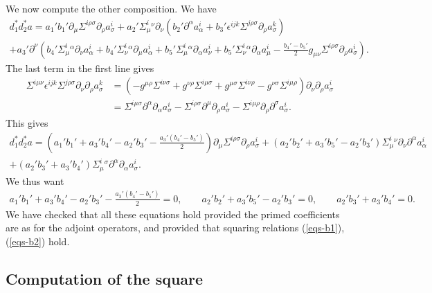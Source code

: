 \documentclass[10pt]{report}
\theoremstyle{definition}
\begin{document}
 We now compute the other composition. We have
 \begin{align}
 d_1^* d_2^* a = a_1' b_1' \partial_\mu \Sigma^{i\rho\sigma} \partial_\rho a_\sigma^i + a_2' \Sigma^i_\mu{}^\nu \partial_\nu (b_2' \partial^\alpha a_\alpha^i + b_3' \epsilon^{ijk} \Sigma^{j\rho\sigma} \partial_\rho a_\sigma^k) \\ \nonumber
 + a_3' \partial^\nu ( b_4' \Sigma^i_{\mu}{}^\alpha \partial_{\nu}a_\alpha^i + b_4' \Sigma^i_{\nu}{}^\alpha \partial_{\mu}a_\alpha^i +  b_5' \Sigma^i_{\mu}{}^\alpha \partial_\alpha a_{\nu}^i+  b_5' \Sigma^i_{\nu}{}^\alpha \partial_\alpha a_{\mu}^i - \frac{b_4'-b_5'}{2} g_{\mu\nu} \Sigma^{i\rho\sigma}\partial_\rho a^i_\sigma).
 \end{align}
 The last term in the first line gives
 \begin{align}
 \Sigma^{i\mu\nu} \epsilon^{ijk} \Sigma^{j\rho\sigma} \partial_\nu \partial_\rho a_\sigma^k & = ( - g^{\mu\rho} \Sigma^{i\nu\sigma} + g^{\nu\rho} \Sigma^{i\mu\sigma} + g^{\mu\sigma} \Sigma^{i\nu\rho} - g^{\nu\sigma} \Sigma^{i\mu\rho})  \partial_\nu \partial_\rho a_\sigma^i \\ \nonumber & = 
 \Sigma^{i\mu\sigma} \partial^\alpha \partial_\alpha   a_\sigma^i
 -  \Sigma^{i\rho\sigma}  \partial^\mu \partial_\rho a_\sigma^i -   \Sigma^{i\mu\rho}  \partial_\rho  \partial^\sigma a_\sigma^i.
 \end{align}
 This gives
 \begin{align}\nonumber
 d_1^* d_2^* a = (a_1' b_1' + a_3' b_4' -  a_2' b_3'  - \frac{a_3'(b_4'-b_5')}{2}) \partial_\mu \Sigma^{i\rho\sigma} \partial_\rho a_\sigma^i + (a_2' b_2'  +  a_3' b_5' -   a_2' b_3' ) \Sigma^i_\mu{}^\nu \partial_\nu  \partial^\alpha a_\alpha^i \\ \nonumber
+ (a_2' b_3' + a_3' b_4' ) \Sigma^{i}_\mu{}^{\sigma} \partial^\alpha \partial_\alpha   a_\sigma^i .
 \end{align}
We thus want
\begin{align}
a_1' b_1' + a_3' b_4' -  a_2' b_3'  - \frac{a_3'(b_4'-b_5')}{2} =0, \qquad a_2' b_2'  +  a_3' b_5' -   a_2' b_3' =0, \qquad a_2' b_3' + a_3' b_4' =0.
\end{align}
We have checked that all these equations hold provided the primed coefficients are as for the adjoint operators, and provided that squaring relations (\ref{eqs-b1}), (\ref{eqs-b2})  hold.



\subsection{Computation of the square}\label{sec:square}
\end{document}
